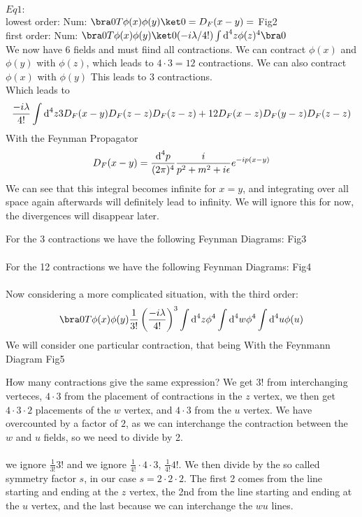 \documentclass[]{scrartcl}
\begin{document}
$Eq1:$ \\ lowest order: Num: $\bra0 T\phi(x)\phi(y)\ket0 = D_F(x-y) =$ Fig2\\
first order: Num: $\bra0 T\phi(x)\phi(y)\ket0 (-i\lambda/4!)\int \text d^4z \phi(z)^4\bra0$\\
We now have 6 fields and must fiind all contractions. We can contract $\phi(x)$ and $\phi(y)$ with $\phi(z)$, which leads to $4\cdot3 = 12$ contractions. We can also contract $\phi(x)$ with $\phi(y)$ This leads to $3$ contractions.\\
Which leads to
\begin{equation}
	\frac{-i\lambda}{4!}\int \text d^4z 3D_F(x-y)D_F(z-z)D_F(z-z) + 12 D_F(x-z)D_F(y-z)D_F(z-z)
\end{equation}
With the Feynman Propagator
\begin{equation}
	D_F(x-y) = \frac{\text d^4p}{(2\pi)^4}\frac{i}{p^2 + m^2 + i\epsilon} e^{-ip(x-y)}
\end{equation}
We can see that this integral becomes infinite for $x = y$, and integrating over all space again afterwards will definitely lead to infinity. We will ignore this for now, the divergences will disappear later.

For the 3 contractions we have the following Feynman Diagrams: Fig3\\\\
For the 12 contractions we have the following Feynman Diagrams: Fig4\\\\
Now considering a more complicated situation, with the third order:
\begin{gather}
	\bra0 T\phi(x)\phi(y) \frac{1}{3!}\left(\frac{-i\lambda}{4!}\right)^3 \int\text d^4z \phi^4 \int \text d^4w \phi^4 \int \text d^4u \phi(u)
\end{gather}
We will consider one particular contraction, that being
With the Feynmann Diagram Fig5

How many contractions give the same expression? We get $3!$ from interchanging verteces, $4\cdot3$ from the placement of contractions in the $z$ vertex, we then get $4\cdot3\cdot2$ placements of the $w$ vertex, and $4\cdot3$ from the $u$ vertex. We have overcounted by a factor of $2$, as we can interchange the contraction between the $w$ and $u$ fields, so we need to divide by 2.\\\\
we ignore $\frac{1}{3!}3!$ and we ignore $\frac{1}{4!}\cdot4\cdot3$, $\frac{1}{4!}4!$. We then divide by the so called symmetry factor $s$, in our case $s=2\cdot2\cdot2$. The first 2 comes from the line starting and ending at the $z$ vertex, the 2nd from the line starting and ending at the $u$ vertex, and the last because we can interchange the $wu$ lines.
\end{document}
